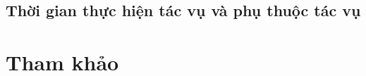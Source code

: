 \documentclass[a4paper, 12pt]{article}
\begin{document}
    \subsection{Thời gian thực hiện tác vụ và phụ thuộc tác vụ}

    \clearpage

    \section{Tham khảo}
    \label{sec:reference}
    \clearpage
\end{document}
